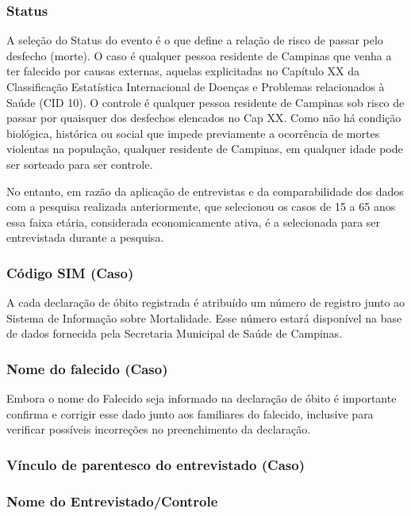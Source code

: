 \subsubsection{Status}

A seleção do Status do evento é o que define a relação de risco de passar pelo desfecho (morte). O caso é qualquer pessoa residente de Campinas que venha a ter falecido por causas externas, aquelas explicitadas no Capítulo XX da Classificação Estatística Internacional de Doenças e Problemas relacionados à Saúde (CID 10). O controle é qualquer pessoa residente de Campinas sob risco de passar por quaisquer dos desfechos elencados no Cap XX. Como não há condição biológica, histórica ou social que impede previamente a ocorrência de mortes violentas na população, qualquer residente de Campinas, em qualquer idade pode ser sorteado para ser controle. 

No entanto, em razão da aplicação de entrevistas e da comparabilidade dos dados com a pesquisa realizada anteriormente, que selecionou os casos de 15 a 65 anos essa faixa etária, considerada economicamente ativa, é a selecionada para ser entrevistada durante a pesquisa.

\subsubsection{Código SIM (Caso)}

A cada declaração de óbito registrada é atribuído um número de registro junto ao Sistema de Informação sobre Mortalidade. Esse número estará disponível na base de dados fornecida pela Secretaria Municipal de Saúde de Campinas.

\subsubsection{Nome do falecido (Caso)}

Embora o nome do Falecido seja informado na declaração de óbito é importante confirma e corrigir esse dado junto aos familiares do falecido, inclusive para verificar possíveis incorreções no preenchimento da declaração.


\subsubsection{Vínculo de parentesco do entrevistado (Caso)}

\subsubsection{Nome do Entrevistado/Controle}


